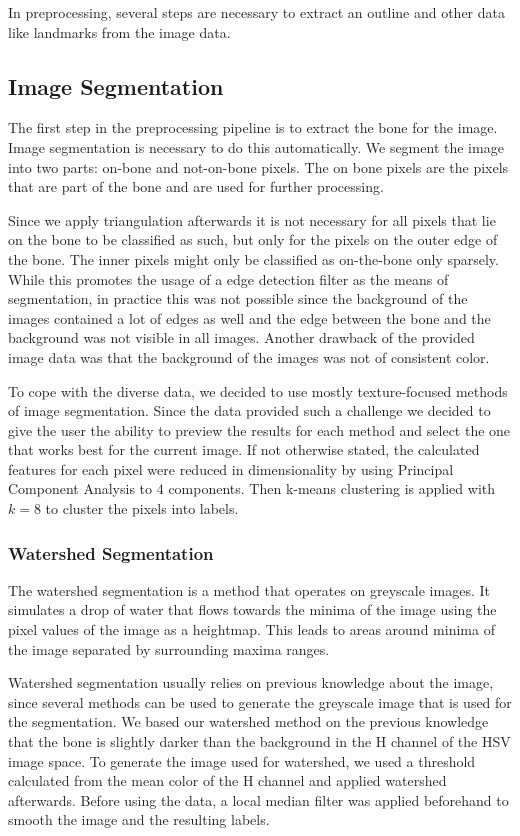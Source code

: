 \documentclass[pdftex,12pt,a4paper]{report}
\begin{document}
In preprocessing, several steps are necessary to extract an outline and other data like landmarks from the image data.

\subsection{Image Segmentation}
\label{sub:segmentation}

The first step in the preprocessing pipeline is to extract the bone for the image. Image segmentation
is necessary to do this automatically. We segment the image into two parts: on-bone and not-on-bone pixels.
The on bone pixels are the pixels that are part of the bone and are used for further processing.

Since we apply triangulation afterwards it is not necessary for all pixels that lie on the bone
to be classified as such, but only for the pixels on the outer edge of the bone. The inner pixels
might only be classified as on-the-bone only sparsely. While this promotes the usage of a edge detection
filter as the means of segmentation, in practice this was not possible since the background of the
images contained a lot of edges as well and the edge between the bone and the background was not
visible in all images. Another drawback of the provided image data was that the background of the images
was not of consistent color.

To cope with the diverse data, we decided to use mostly texture-focused methods of image segmentation. Since the data provided such a challenge we decided to give the user the ability to preview the results for each method and select the one that works best for the current image. If not otherwise stated, the calculated features for each pixel were reduced in dimensionality by using Principal Component Analysis to $4$ components. Then k-means clustering is applied with $k=8$ to cluster the pixels into labels.

\subsubsection{Watershed Segmentation}
\label{subsub:segmentationwatershed}

The watershed segmentation is a method that operates on greyscale images. It simulates a drop of water that flows towards the minima of the image using the pixel values of the image as a heightmap. This leads to areas around minima of the image separated by surrounding maxima ranges.

Watershed segmentation usually relies on previous knowledge about the image, since several methods can be used to generate the greyscale image that is used for the segmentation. We based our watershed method on the previous knowledge that the bone is slightly darker than the background in the H channel of the HSV image space. To generate the image used for watershed, we used a threshold calculated from the mean color of the H channel and applied watershed afterwards. Before using the data, a local median filter was applied beforehand to smooth the image and the resulting labels.
\end{document}
